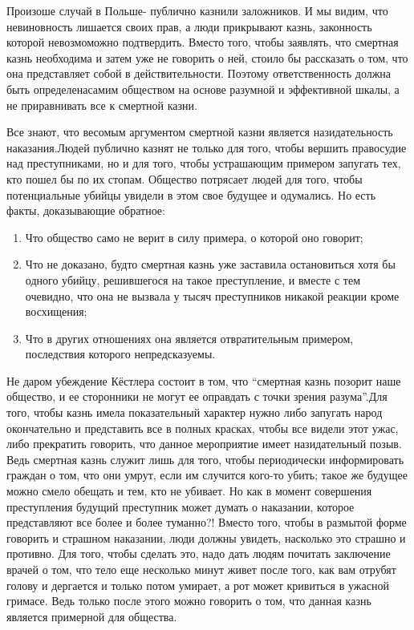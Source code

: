 \documentclass{report}
\begin{document}
Произоше случай в Польше- публично казнили заложников. И мы видим, что невиновность лишается своих прав, а люди прикрывают казнь, законность которой невозмоможно подтвердить. Вместо того, чтобы заявлять, что смертная казнь необходима и затем уже не говорить о ней, стоило бы рассказать о том, что она представляет собой в действительности. Поэтому ответственность должна быть определенасамим обществом на основе разумной и эффективной шкалы, а не приравнивать все к смертной казни.

Все знают, что весомым аргументом смертной казни является назидательность наказания.Людей публично казнят не только для того, чтобы вершить правосудие над преступниками, но и для того, чтобы устрашающим примером запугать тех, кто пошел бы по их стопам. Общество потрясает людей для того, чтобы потенциальные убийцы увидели в этом свое будущее и одумались.
Но есть факты, доказывающие обратное: 

\begin{enumerate} %
    \item Что общество само не верит в силу примера, о которой оно говорит;
    \item Что не доказано, будто смертная казнь уже заставила остановиться хотя бы одного убийцу, решившегося на такое преступление, и вместе с тем очевидно, что она не вызвала у тысяч преступников никакой реакции кроме восхищения;
    \item Что в других отношениях она является отвратительным примером, последствия которого непредсказуемы.
\end{enumerate}


 Не даром убеждение Кёстлера состоит в том, что “смертная казнь позорит наше общество, и ее сторонники не могут ее оправдать с точки зрения разума”.Для того, чтобы казнь имела показательный характер нужно либо запугать народ окончательно и представить все в полных красках, чтобы все видели этот ужас, либо прекратить говорить, что данное мероприятие имеет назидательный позыв. Ведь смертная казнь служит лишь для того, чтобы периодически информировать граждан о том, что они умрут, если им случится кого-то убить; такое же будущее можно смело обещать и тем, кто не убивает. Но как в момент совершения преступления будущий преступник может думать о наказании, которое представляют все более и более туманно?! Вместо того, чтобы в размытой форме говорить и страшном наказании, люди должны увидеть, насколько это страшно и противно. Для того, чтобы сделать это, надо дать людям почитать заключение врачей о том, что тело еще несколько минут живет после того, как вам отрубят голову и дергается и только потом умирает, а рот может кривиться в ужасной гримасе. Ведь только после этого можно говорить о том, что данная казнь является примерной для общества.
 
\end{document}
